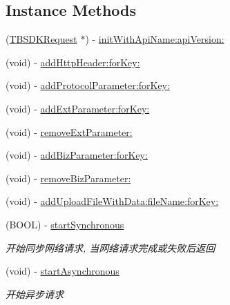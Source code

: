 \subsection*{Instance Methods}
\begin{DoxyCompactItemize}
\item 
(\mbox{\hyperlink{interface_t_b_s_d_k_request}{T\+B\+S\+D\+K\+Request}} $\ast$) -\/ \mbox{\hyperlink{interface_t_b_s_d_k_request_afe2acfd63db98b38bb39bdf8871e8e57}{init\+With\+Api\+Name\+:api\+Version\+:}}
\item 
(void) -\/ \mbox{\hyperlink{interface_t_b_s_d_k_request_a94cedf08c4dbb4214146013e30dcbc6b}{add\+Http\+Header\+:for\+Key\+:}}
\item 
(void) -\/ \mbox{\hyperlink{interface_t_b_s_d_k_request_a928333008017bd9bc2e3111ad66f8655}{add\+Protocol\+Parameter\+:for\+Key\+:}}
\item 
(void) -\/ \mbox{\hyperlink{interface_t_b_s_d_k_request_afbdaba94fcf578f6ceb298ce593f9f23}{add\+Ext\+Parameter\+:for\+Key\+:}}
\item 
(void) -\/ \mbox{\hyperlink{interface_t_b_s_d_k_request_a46188e6c3d2c18bd93b4fc899a642e09}{remove\+Ext\+Parameter\+:}}
\item 
(void) -\/ \mbox{\hyperlink{interface_t_b_s_d_k_request_a6c06970c55e540ac093831c085af5ab0}{add\+Biz\+Parameter\+:for\+Key\+:}}
\item 
(void) -\/ \mbox{\hyperlink{interface_t_b_s_d_k_request_affb181c3ffea7cfeba99e2b796daf49a}{remove\+Biz\+Parameter\+:}}
\item 
(void) -\/ \mbox{\hyperlink{interface_t_b_s_d_k_request_acbc168a898196acc2357c3326e9138fd}{add\+Upload\+File\+With\+Data\+:file\+Name\+:for\+Key\+:}}
\item 
\mbox{\label{interface_t_b_s_d_k_request_a5b8fc277715e8d60d59220dcaaa0b8ec}} 
(B\+O\+OL) -\/ \mbox{\hyperlink{interface_t_b_s_d_k_request_a5b8fc277715e8d60d59220dcaaa0b8ec}{start\+Synchronous}}
\begin{DoxyCompactList}\small\item\em 开始同步网络请求, 当网络请求完成或失败后返回 \end{DoxyCompactList}\item 
\mbox{\label{interface_t_b_s_d_k_request_aea224c2dd88ef42d406a924010586df3}} 
(void) -\/ \mbox{\hyperlink{interface_t_b_s_d_k_request_aea224c2dd88ef42d406a924010586df3}{start\+Asynchronous}}
\begin{DoxyCompactList}\small\item\em 开始异步请求 \end{DoxyCompactList}\item 

\end{DoxyCompactItemize}
